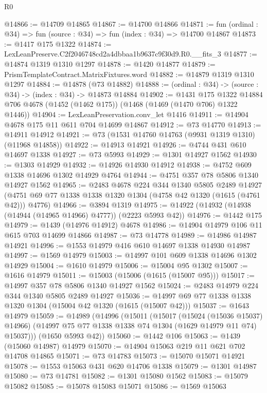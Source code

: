\begin{lexlean}{R0}
\begin{coremodule}
@14866 := @14709 @14865
@14867 := @14700 @14866
@14871 := fun (ordinal : @34) => fun (source : @34) => fun (index : @34) => @14700 @14867
@14873 := @1417 @175 @1322
@14874 := LexLeanPreserve.C2f2046748cd2a4dbbaa1b9637c9f30d9.R0.__fits_3
@14877 := @14874 @1319 @1310 @1297
@14878 := @1420 @14877
@14879 := PrismTemplateContract.MatrixFixtures.word
@14882 := @14879 @1319 @1310 @1297
@14884 := @14878 (@73 @14882)
@14888 := (ordinal : @34) -> (source : @34) -> (index : @34) -> @14873 @14884
@14902 := @1431
    @175
    @1322
    @14884
    @706
    @4678
    (@1452 (@1462 @175))
    (@1468 (@1469 (@1470 @706) @1322 @1446))
@14904 := LexLeanPreservation.conv_let @1416
@14911 := @14904 @4678 @175 @11 @611 @704 @14699 @14867
@14912 := @73 @14770
@14913 := @14911 @14912
@14921 := @73 (@1531 @14760 @14763 (@9931 @1319 @1310) (@11968 @14858))
@14922 := @14913 @14921
@14926 := @4744 @431 @610 @14697 @1338
@14927 := @73 @5993
@14929 := @1301 @14927 @1562
@14930 := @1303 @14929
@14932 := @14926 @14930 @14912
@14938 := @4752 @609 @1338 @14696 @1302 @14929 @4764
@14944 := @4751 @357 @78 @5806 @1340 @14927 @1562
@14965 := @2483
    @4678
    @224
    @344
    @1340
    @5805
    @2489
    @14927
    (@4751 @69 @77 @1338 @1338 @1320 @1304 (@4758 @42 @1320 (@1615 (@4761 @42))) @4776)
@14966 := @3894 @1319
@14975 := @14922 (@14932 (@14938 (@14944 (@14965 @14966) @4777)) (@2223 @5993 @42))
@14976 := @1442 @175
@14979 := @1439 (@14976 @14912) @4678
@14986 := @14904 @14979 @106 @11 @615 @703 @14699 @14866
@14987 := @73 @14778
@14989 := @14986 @14987 @14921
@14996 := @1553 @14979 @416 @610 @14697 @1338 @14930 @14987
@14997 := @1569 @14979
@15003 := @14997 @101 @609 @1338 @14696 @1302 @14929
@15004 := @1610 @14979
@15006 := @15004 @95 @1302
@15007 := @1616 @14979
@15011 := @15003 (@15006 (@1615 (@15007 @95)))
@15017 := @14997 @357 @78 @5806 @1340 @14927 @1562
@15024 := @2483 @14979 @224 @344 @1340 @5805 @2489 @14927
@15036 := @14997 @69 @77 @1338 @1338 @1320 @1304 (@15004 @42 @1320 (@1615 (@15007 @42)))
@15037 := @1643 @14979
@15059 := @14989
    (@14996
      (@15011
        (@15017
          (@15024 (@15036 @15037) @14966)
          (@14997 @75 @77 @1338 @1338 @74 @1304 (@1629 @14979 @11 @74) @15037)))
      (@1650 @5993 @42))
@15060 := @1442 @106
@15063 := @1439 (@15060 @14987) @14979
@15070 := @14904 @15063 @219 @11 @621 @702 @14708 @14865
@15071 := @73 @14783
@15073 := @15070 @15071 @14921
@15078 := @1553 @15063 @431 @620 @14706 @1338
@15079 := @1301 @14987
@15080 := @73 @14781
@15082 := @1301 @15080 @1562
@15083 := @15079 @15082
@15085 := @15078 @15083 @15071
@15086 := @1569 @15063

\end{coremodule}
\end{lexlean}
